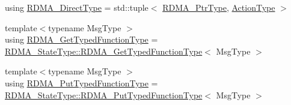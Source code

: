 \begin{DoxyCompactItemize}
\item 
using \hyperlink{structvt_1_1rdma_1_1_r_d_m_a_manager_a8bce76d1b441ca17daf84835eb9a7dec}{R\+D\+M\+A\+\_\+\+Direct\+Type} = std\+::tuple$<$ \hyperlink{namespacevt_a9e2c953286c7616f7c218e9951790776}{R\+D\+M\+A\+\_\+\+Ptr\+Type}, \hyperlink{namespacevt_ae0a5a7b18cc99d7b732cb4d44f46b0f3}{Action\+Type} $>$
\item 
{\footnotesize template$<$typename Msg\+Type $>$ }\\using \hyperlink{structvt_1_1rdma_1_1_r_d_m_a_manager_a0d865535d118fe9dcab074fd3df74ce1}{R\+D\+M\+A\+\_\+\+Get\+Typed\+Function\+Type} = \hyperlink{structvt_1_1rdma_1_1_state_a95b006a568982435e63aa18feb5fc202}{R\+D\+M\+A\+\_\+\+State\+Type\+::\+R\+D\+M\+A\+\_\+\+Get\+Typed\+Function\+Type}$<$ Msg\+Type $>$
\item 
{\footnotesize template$<$typename Msg\+Type $>$ }\\using \hyperlink{structvt_1_1rdma_1_1_r_d_m_a_manager_ad9746ec3367968e16945ef88c1ac45ce}{R\+D\+M\+A\+\_\+\+Put\+Typed\+Function\+Type} = \hyperlink{structvt_1_1rdma_1_1_state_a3f76d1ccdab20ed3091e36d8fb9ecda5}{R\+D\+M\+A\+\_\+\+State\+Type\+::\+R\+D\+M\+A\+\_\+\+Put\+Typed\+Function\+Type}$<$ Msg\+Type $>$
\end{DoxyCompactItemize}
